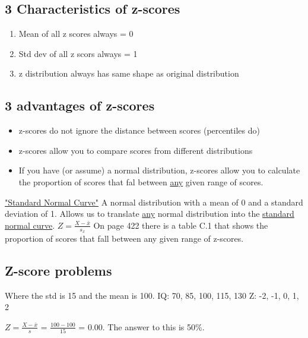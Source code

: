 \documentclass[11pt]{report}
\begin{document}
\subsection{3 Characteristics of z-scores}
\begin{enumerate}
    \item Mean of all z scores always = 0
    \item Std dev of all z scors always = 1
    \item z distribution always has same shape as original distribution
\end{enumerate}

\subsection{3 advantages of z-scores}
\begin{itemize}
    \item z-scores do not ignore the distance between scores (percentiles do)
    \item z-scores allow you to compare scores from different distributions
    \item If you have (or assume) a normal distribution, z-scores allow you to calculate the proportion of scores that fal between \underline{any} given range of scores.
\end{itemize}

\noindent\underline{"Standard Normal Curve"} A normal distribution with a mean of 0 and a standard deviation of 1. Allows us to translate \underline{any} normal distribution into the \underline{standard normal curve}. $Z = \frac{X - \bar{x}}{s_x}$
\newline\newline
\noindent On page 422 there is a table C.1 that shows the proportion of scores that fall between any given range of z-scores. 

\subsection{Z-score problems}
{
Where the std is 15 and the mean is 100. \newline
IQ: 70, 85, 100, 115, 130 \newline
Z: -2, -1, 0, 1, 2 \newline

$Z = \frac{X - \bar{x}}{s}$ = $\frac{100 - 100}{15}$ = 0.00. \newline
The answer to this is 50\%.
}
\end{document}
